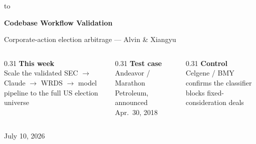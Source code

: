 \documentclass[aspectratio=169,10pt]{beamer}
\begin{document}
\begin{frame}
  \hbox to
  \vspace{1.2cm}

  {\Huge\bfseries\color{navy}Codebase Workflow Validation}\par
  \vspace{0.35cm}
  {\large\color{slate}Corporate-action election arbitrage --- Alvin \& Xiangyu}\par
  \vspace{1.1cm}

  \begin{columns}[T]
    \begin{column}{0.31\textwidth}
      {\bfseries\color{navy}This week}\\[3pt]
      {\small Scale the validated SEC \(\rightarrow\) Claude \(\rightarrow\) WRDS \(\rightarrow\) model pipeline to the full US election universe}
    \end{column}
    \begin{column}{0.31\textwidth}
      {\bfseries\color{navy}Test case}\\[3pt]
      {\small Andeavor / Marathon Petroleum, announced Apr.\ 30, 2018}
    \end{column}
    \begin{column}{0.31\textwidth}
      {\bfseries\color{navy}Control}\\[3pt]
      {\small Celgene / BMY confirms the classifier blocks fixed-consideration deals}
    \end{column}
  \end{columns}

  \vspace{1.0cm}
  {\small\color{slate}July 10, 2026}
\end{frame}
\end{document}
